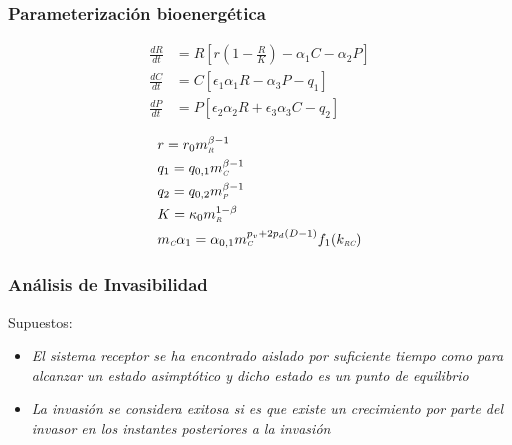 \documentclass[11 pt,t]{beamer}
\newcommand{\PP}{\textit{\tiny P}}
\newcommand{\CC}{\textit{\tiny C}}
\newcommand{\R}{\textit{\tiny R}}
\newcommand{\RC}{\textit{\tiny RC}}
\begin{document}
\begin{frame}
    
\end{frame}
\begin{frame}
  \frametitle{Parameterizaci\'on bioenerg\'etica}
  \centering
  \begin{equation}
    \begin{aligned} 
      \frac{dR}{dt} &= R\left[ r(1-\frac{R}{K})- \alpha_1 C -\alpha_2 P \right] \\
      \frac{dC}{dt} &= C \left[ \epsilon_1 \alpha_1 R - \alpha_3  P - q_1 \right] \\
      \frac{dP}{dt} &= P \left[ \epsilon_2 \alpha_2 R + \epsilon_3 \alpha_3 C - q_2 \right]
    \end{aligned}
  \end{equation}

  \begin{equation}\label{eq:params3}
\begin{aligned}
&r = r_0m_{\R}^{\beta - 1} \\
&q_1=q_{0,1}m_{\CC}^{\beta - 1} \\
&q_2= q_{0,2}m_{\PP}^{\beta -1}\\
&K= \kappa_{0}m_{\R}^{1-\beta}\\
&m_{\CC} \alpha_1= \alpha_{0,1}m_{\CC}^{p_v+2p_d(D - 1)}f_1(k_{\RC})\\
\end{aligned}
\end{equation}
\end{frame}
\begin{frame}
  \frametitle{An\'alisis de Invasibilidad}
  \Large Supuestos:
  \begin{itemize}
    \item \emph{El sistema receptor se ha encontrado aislado por suficiente tiempo como para alcanzar un estado asimpt\'otico y dicho estado es un punto de equilibrio}
    \item \emph{La invasi\'on se considera exitosa si es que existe un crecimiento por parte del invasor en los instantes posteriores a la invasi\'on}
    \end{itemize}
\end{frame}
\end{document}

